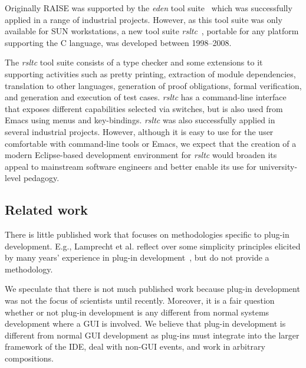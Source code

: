 \documentclass[conference]{IEEEtran}
\begin{document}
Originally RAISE was supported by the \emph{eden} tool
suite~\cite{edenReferenceManual} which was successfully applied in a
range of industrial projects.  However, as this tool suite was only
available for SUN workstations, a new tool suite
\emph{rsltc}~\cite{rsltcUserGuide,RAISETools2003}, portable for any
platform supporting the C language, was developed between 1998--2008.

The \emph{rsltc} tool suite consists of a type checker and some
extensions to it supporting activities such as pretty printing,
extraction of module dependencies, translation to other languages,
generation of proof obligations, formal verification, and generation
and execution of test cases.  \emph{rsltc} has a command-line
interface that exposes different capabilities selected via switches,
but is also used from Emacs using menus and key-bindings.  \emph{rsltc}
was also successfully applied in several industrial projects.
However, although it is easy to use for the user comfortable with
command-line tools or Emacs, we expect that the creation of a modern
Eclipse-based development environment for \emph{rsltc} would broaden
its appeal to mainstream software engineers and better enable its use
for university-level pedagogy.

%
\subsection{Related work}
\label{sec:related-work}

There is little published work that focuses on methodologies specific
to plug-in development.  E.g., Lamprecht et al. reflect over some
simplicity principles elicited by many years' experience in plug-in
development~\cite{6229816}, but do not provide a methodology.

We speculate that there is not much published work because plug-in
development was not the focus of scientists until recently.
Moreover, it is a fair question whether or not plug-in development is
any different from normal systems development where a GUI is involved.
We believe that plug-in development is different from normal GUI
development as plug-ins must integrate into the larger framework
of the IDE, deal with non-GUI events, and work in arbitrary
compositions.

\end{document}
